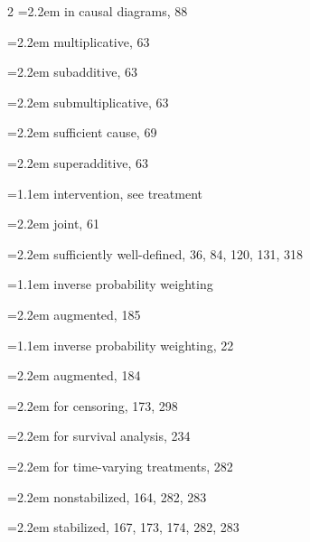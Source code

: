\begin{multicols}{2}
\hspace*{1.1em}\hangindent=2.2em in causal diagrams, 88\par
\hspace*{1.1em}\hangindent=2.2em multiplicative, 63\par
\hspace*{1.1em}\hangindent=2.2em subadditive, 63\par
\hspace*{1.1em}\hangindent=2.2em submultiplicative, 63\par
\hspace*{1.1em}\hangindent=2.2em sufficient cause, 69\par
\hspace*{1.1em}\hangindent=2.2em superadditive, 63\par
\hangindent=1.1em intervention, see treatment\par
\hspace*{1.1em}\hangindent=2.2em joint, 61\par
\hspace*{1.1em}\hangindent=2.2em sufficiently well-defined, 36, 84, 120, 131, 318\par
\hangindent=1.1em inverse probability weighting\par
\hspace*{1.1em}\hangindent=2.2em augmented, 185\par
\hangindent=1.1em inverse probability weighting, 22\par
\hspace*{1.1em}\hangindent=2.2em augmented, 184\par
\hspace*{1.1em}\hangindent=2.2em for censoring, 173, 298\par
\hspace*{1.1em}\hangindent=2.2em for survival analysis, 234\par
\hspace*{1.1em}\hangindent=2.2em for time-varying treatments, 282\par
\hspace*{1.1em}\hangindent=2.2em nonstabilized, 164, 282, 283\par
\hspace*{1.1em}\hangindent=2.2em stabilized, 167, 173, 174, 282, 283\par

\end{multicols}
